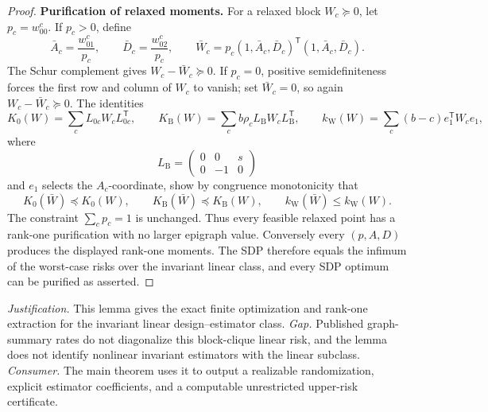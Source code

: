 \documentclass{article}
\begin{document}
\begin{proof}
\textbf{Purification of relaxed moments.} For a relaxed block \(W_c\succeq0\), let \(p_c=w^c_{00}\). If \(p_c>0\), define
\[
\bar A_c=\frac{w^c_{01}}{p_c},
\qquad
\bar D_c=\frac{w^c_{02}}{p_c},
\qquad
\bar W_c=p_c(1,\bar A_c,\bar D_c)^{\mathsf T}(1,\bar A_c,\bar D_c).
\]
The Schur complement gives \(W_c-\bar W_c\succeq0\). If \(p_c=0\), positive semidefiniteness forces the first row and column of \(W_c\) to vanish; set \(\bar W_c=0\), so again \(W_c-\bar W_c\succeq0\). The identities
\[
K_0(W)=\sum_cL_{0c}W_cL_{0c}^{\mathsf T},
\qquad
K_{\mathrm B}(W)=\sum_cb\rho_cL_{\mathrm B}W_cL_{\mathrm B}^{\mathsf T},
\qquad
k_{\mathrm W}(W)=\sum_c(b-c)e_1^{\mathsf T}W_ce_1,
\]
where
\[
L_{\mathrm B}=\begin{pmatrix}0&0&s\\0&-1&0\end{pmatrix}
\]
and \(e_1\) selects the \(A_c\)-coordinate, show by congruence monotonicity that
\[
K_0(\bar W)\preceq K_0(W),
\qquad
K_{\mathrm B}(\bar W)\preceq K_{\mathrm B}(W),
\qquad
k_{\mathrm W}(\bar W)\le k_{\mathrm W}(W).
\]
The constraint \(\sum_cp_c=1\) is unchanged. Thus every feasible relaxed point has a rank-one purification with no larger epigraph value. Conversely every \((p,A,D)\) produces the displayed rank-one moments. The SDP therefore equals the infimum of the worst-case risks over the invariant linear class, and every SDP optimum can be purified as asserted.
\end{proof}
\par\smallskip\noindent \textit{Justification.} This lemma gives the exact finite optimization and rank-one extraction for the invariant linear design--estimator class. \textit{Gap.} Published graph-summary rates do not diagonalize this block-clique linear risk, and the lemma does not identify nonlinear invariant estimators with the linear subclass. \textit{Consumer.} The main theorem uses it to output a realizable randomization, explicit estimator coefficients, and a computable unrestricted upper-risk certificate.
\end{document}
